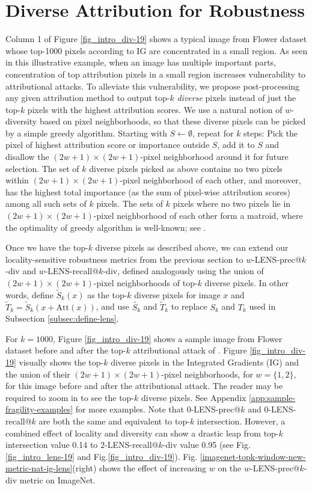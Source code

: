 \documentclass[letterpaper]{article} %
\begin{document}
\section{Diverse Attribution for Robustness} \label{sec:div-lens}
Column 1 of Figure \ref{fig_intro_div-19} shows a typical  image from Flower dataset whose top-1000 pixels according to IG are concentrated in a small region. As seen in this illustrative example, when an image has multiple important parts, concentration of top attribution pixels in a small region increases vulnerability to attributional attacks. To alleviate this vulnerability, we propose post-processing any given attribution method to output top-$k$ \emph{diverse} pixels instead of just the top-$k$ pixels with the highest attribution scores. We use a natural notion of $w$-diversity based on pixel neighborhoods, so that these diverse pixels can be picked by a simple greedy algorithm. Starting with $S \leftarrow \emptyset$, repeat for $k$ steps: Pick the pixel of highest attribution score or importance outside $S$, add it to $S$ and disallow the $(2w+1) \times (2w+1)$-pixel neighborhood around it for future selection. The set of $k$ diverse pixels picked as above contains no two pixels within $(2w+1) \times (2w+1)$-pixel neighborhood of each other, and moreover, has the highest total importance (as the sum of pixel-wise attribution scores) among all such sets of $k$ pixels. The sets of $k$ pixels where no two pixels lie in $(2w+1) \times (2w+1)$-pixel neighborhood of each other form a matroid, where the optimality of greedy algorithm is well-known; see \citet{KorteLovasz1981}.

Once we have the top-$k$ diverse pixels as described above, we can extend our locality-sensitive robustness metrics from the previous section to $w$-LENS-prec@$k$-div and $w$-LENS-recall@$k$-div, defined analogously using the union of $(2w+1) \times (2w+1)$-pixel neighborhoods of top-$k$ diverse pixels. In other words, define $\tilde{S}_{k}(x)$ as the top-$k$ diverse pixels for image $x$ and $\tilde{T}_{k} = \tilde{S}_{k}(x  + \text{Att}(x))$, and use $\tilde{S_{k}}$ and $\tilde{T}_{k}$ to replace $S_{k}$ and $T_{k}$ used in Subsection \ref{subsec:define-lens}.

For $k=1000$, Figure \ref{fig_intro_div-19} shows a sample image from Flower dataset before and after the top-$k$ attributional attack of \citet{ghorbani2018interpretation}. Figure \ref{fig_intro_div-19} visually shows the top-$k$ diverse pixels in the Integrated Gradients (IG) and the union of their $(2w+1) \times (2w+1)$-pixel neighborhoods, for $w=\{1, 2\}$, for this image before and after the attributional attack. The reader may be required to zoom in to see the top-$k$ diverse pixels. See Appendix \ref{app:sample-fragility-examples} for more examples. Note that $0$-LENS-prec@$k$ and $0$-LENS-recall@$k$ are both the same and equivalent to top-$k$ intersection. However, a combined effect of locality and diversity can show a drastic leap from top-$k$ intersection value 0.14 to $2$-LENS-recall@$k$-div value 0.95 (see Fig.\ref{fig_intro_lens-19} and Fig.\ref{fig_intro_div-19}). Fig. \ref{imagenet-topk-window-new-metric-nat-ig-lens}(right) shows the effect of increasing $w$ on the $w$-LENS-prec@$k$-div metric on ImageNet.
\end{document}
